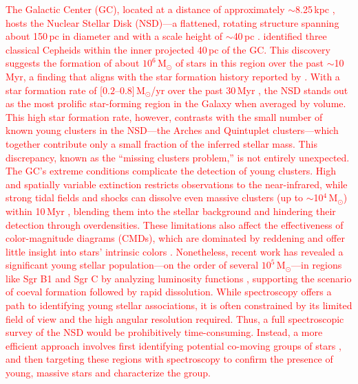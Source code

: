 \documentclass{aa} %
\begin{document}
	\textcolor{red}{The Galactic Center (GC), located at a distance of approximately $\sim$8.25\,kpc \citep{GC_distance_gravity}, hosts the Nuclear Stellar Disk (NSD)—a flattened, rotating structure spanning about 150\,pc in diameter and with a scale height of $\sim$40\,pc \citep{Sch2015, Ban_catalog, Launhardt_2002, Sormani2022}. \citet{three_cepheids} identified three classical Cepheids within the inner projected 40\,pc of the GC. This discovery suggests the formation of about $10^6$\,M$_\odot$ of stars in this region over the past $\sim$10\,Myr, a finding that aligns with the star formation history reported by \citet{paco_nature_2020}. With a star formation rate of $[0.2$--$0.8]$\,M$_\odot$/yr over the past 30\,Myr \citep{three_cepheids, paco_nature_2020}, the NSD stands out as the most prolific star-forming region in the Galaxy when averaged by volume.
	This high star formation rate, however, contrasts with the small number of known young clusters in the NSD—the Arches and Quintuplet clusters—which together contribute only a small fraction of the inferred stellar mass. This discrepancy, known as the “missing clusters problem,” is not entirely unexpected. The GC's extreme conditions complicate the detection of young clusters. High and spatially variable extinction \citep{extinction_los, paco_exctinction} restricts observations to the near-infrared, while strong tidal fields and shocks can dissolve even massive clusters (up to $\sim$10$^4$\,M$_\odot$) within 10\,Myr \citep{dissolve_GC, cluster_dissolution}, blending them into the stellar background and hindering their detection through overdensities. These limitations also affect the effectiveness of color-magnitude diagrams (CMDs), which are dominated by reddening and offer little insight into stars' intrinsic colors \citep{GNSI}. Nonetheless, recent work has revealed a significant young stellar population—on the order of several $10^5$\,M$_\odot$—in regions like Sgr B1 and Sgr C by analyzing luminosity functions \citep{Paco_B1, Paco_SgrC}, supporting the scenario of coeval formation followed by rapid dissolution.
	While spectroscopy offers a path to identifying young stellar associations, it is often constrained by its limited field of view and the high angular resolution required. Thus, a full spectroscopic survey of the NSD would be prohibitively time-consuming. Instead, a more efficient approach involves first identifying potential co-moving groups of stars \citep[e.g.,][]{Ban_cluster, comuving_yo}, and then targeting these regions with spectroscopy to confirm the presence of young, massive stars and characterize the group.
}
\end{document}
